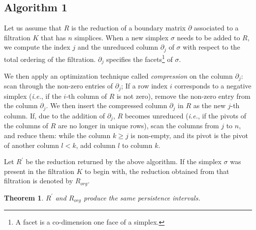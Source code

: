 \documentclass[11pt]{article}
\newtheorem{theorem}{Theorem}[section]
\begin{document}
\subsection{Algorithm 1}

Let us assume that $R$ is the reduction of a boundary matrix $\partial$ associated to a filtration 
$K$ that has $n$ simplices.  When a new simplex $\sigma$ needs to be added to $R$, we compute the 
index $j$ and the unreduced column $\partial_j$ of $\sigma$ with respect to the total ordering of 
the filtration.  $\partial_j$ specifies the facets\footnote{A facet is a co-dimension one face of a 
simplex.} of $\sigma$.

We then apply an optimization technique called \emph{compression} \cite{kerber-18} on the column 
$\partial_j$: scan through the non-zero entries of $\partial_j$; If a row index $i$ corresponds to 
a negative simplex (\emph{i.e.}, if the $i$-th column of $R$ is not zero), remove the non-zero entry
from the column $\partial_j$.  We then insert the compressed column $\partial_j$ in $R$ as the new 
$j$-th column.  If, due to the addition of $\partial_j$, $R$ becomes unreduced (\emph{i.e.}, if the 
pivots of the columns of $R$ are no longer in unique rows), scan the columns from $j$ to $n$, and 
reduce them: while the column $k \geq j$ is non-empty, and its pivot is the pivot of another column 
$l < k$, add column $l$ to column $k$.


Let $R^\prime$ be the reduction returned by the above algorithm.  If the simplex $\sigma$ was 
present in the filtration $K$ to begin with, the reduction obtained from that filtration is denoted 
by $R_{org}$.


\begin{theorem}\label{th1}
	$R^\prime$ and $R_{org}$ produce the same persistence intervals.
\end{theorem}
\end{document}
